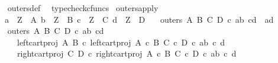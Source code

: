 \begin{isabellebody}
%
\isadelimproof
\ \ %
\endisadelimproof
%
\isatagproof
{}\isamarkupfalse%
\ outers{\isacharunderscore}{\kern0pt}def\ \isamarkupfalse%
\ typecheck{\isacharunderscore}{\kern0pt}cfuncs%
\endisatagproof
{\isafoldproof}%
%
\isadelimproof
\isanewline
%
\endisadelimproof
\isanewline
{}\isamarkupfalse%
\ outers{\isacharunderscore}{\kern0pt}apply{\isacharcolon}{\kern0pt}\isanewline
\ \ \ {\isachardoublequoteopen}a\ {\isacharcolon}{\kern0pt}\ Z\ {\isasymrightarrow}\ A{\isachardoublequoteclose}\ {\isachardoublequoteopen}b\ {\isacharcolon}{\kern0pt}\ Z\ {\isasymrightarrow}\ B{\isachardoublequoteclose}\ {\isachardoublequoteopen}c\ {\isacharcolon}{\kern0pt}\ Z\ {\isasymrightarrow}\ C{\isachardoublequoteclose}\ {\isachardoublequoteopen}d\ {\isacharcolon}{\kern0pt}\ Z\ {\isasymrightarrow}\ D{\isachardoublequoteclose}\isanewline
\ \ \ {\isachardoublequoteopen}outers\ A\ B\ C\ D\ {\isasymcirc}\isactrlsub c\ {\isasymlangle}{\isasymlangle}a{\isacharcomma}{\kern0pt}b{\isasymrangle}{\isacharcomma}{\kern0pt}\ {\isasymlangle}c{\isacharcomma}{\kern0pt}d{\isasymrangle}{\isasymrangle}\ {\isacharequal}{\kern0pt}\ {\isasymlangle}a{\isacharcomma}{\kern0pt}d{\isasymrangle}{\isachardoublequoteclose}\isanewline
%
\isadelimproof
%
\endisadelimproof
%
\isatagproof
{}\isamarkupfalse%
\ {\isacharminus}{\kern0pt}\isanewline
\ \ \isamarkupfalse%
\ {\isachardoublequoteopen}outers\ A\ B\ C\ D\ {\isasymcirc}\isactrlsub c\ {\isasymlangle}{\isasymlangle}a{\isacharcomma}{\kern0pt}b{\isasymrangle}{\isacharcomma}{\kern0pt}\ {\isasymlangle}c{\isacharcomma}{\kern0pt}d{\isasymrangle}{\isasymrangle}\ {\isacharequal}{\kern0pt}\ {\isasymlangle}\isanewline
\ \ \ \ \ \ left{\isacharunderscore}{\kern0pt}cart{\isacharunderscore}{\kern0pt}proj\ A\ B\ {\isasymcirc}\isactrlsub c\ left{\isacharunderscore}{\kern0pt}cart{\isacharunderscore}{\kern0pt}proj\ {\isacharparenleft}{\kern0pt}A\ {\isasymtimes}\isactrlsub c\ B{\isacharparenright}{\kern0pt}\ {\isacharparenleft}{\kern0pt}C\ {\isasymtimes}\isactrlsub c\ D{\isacharparenright}{\kern0pt}\ {\isasymcirc}\isactrlsub c\ {\isasymlangle}{\isasymlangle}a{\isacharcomma}{\kern0pt}b{\isasymrangle}{\isacharcomma}{\kern0pt}\ {\isasymlangle}c{\isacharcomma}{\kern0pt}\ d{\isasymrangle}{\isasymrangle}{\isacharcomma}{\kern0pt}\isanewline
\ \ \ \ \ \ right{\isacharunderscore}{\kern0pt}cart{\isacharunderscore}{\kern0pt}proj\ C\ D\ {\isasymcirc}\isactrlsub c\ right{\isacharunderscore}{\kern0pt}cart{\isacharunderscore}{\kern0pt}proj\ {\isacharparenleft}{\kern0pt}A\ {\isasymtimes}\isactrlsub c\ B{\isacharparenright}{\kern0pt}\ {\isacharparenleft}{\kern0pt}C\ {\isasymtimes}\isactrlsub c\ D{\isacharparenright}{\kern0pt}\ {\isasymcirc}\isactrlsub c\ {\isasymlangle}{\isasymlangle}a{\isacharcomma}{\kern0pt}b{\isasymrangle}{\isacharcomma}{\kern0pt}\ {\isasymlangle}c{\isacharcomma}{\kern0pt}\ d{\isasymrangle}{\isasymrangle}\isanewline

\end{isabellebody}
